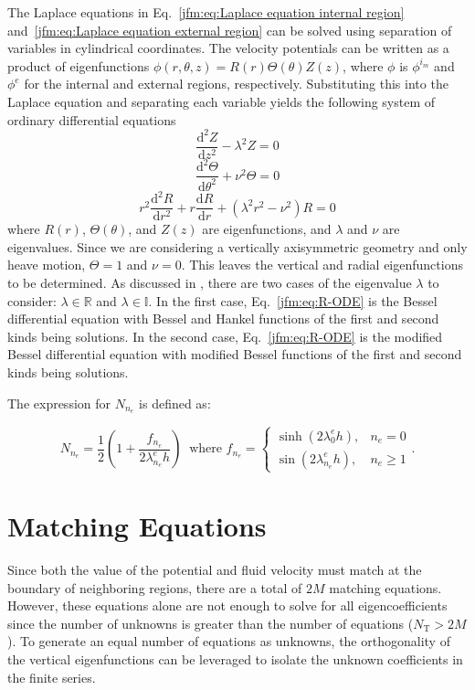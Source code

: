 The Laplace equations in Eq.~\ref{jfm:eq:Laplace equation internal region} and~\ref{jfm:eq:Laplace equation external region} can be solved using separation of variables in cylindrical coordinates. The velocity potentials can be written as a product of eigenfunctions $\phi (r, \theta, z)= R(r)\Theta(\theta)Z(z)$, where $\phi$ is $\phi^{i_m}$ and $\phi^{e}$ for the internal and external regions, respectively. Substituting this into the Laplace equation and separating each variable yields the following system of ordinary differential equations
\begin{equation}\label{jfm:eq:Z-ODE}
    \frac{\mathrm{d}^2 Z}{\mathrm{d}z^2}-\lambda^2Z=0
\end{equation}
\begin{equation}\label{jfm:eq:Theta-ODE}
    \frac{\mathrm{d}^2 \Theta}{\mathrm{d}\theta^2}+\nu^2\Theta=0
\end{equation}
\begin{equation}\label{jfm:eq:R-ODE}
    r^2\frac{\mathrm{d}^2 R}{\mathrm{d}r^2}+r\frac{\mathrm{d} R}{\mathrm{d}r} + (\lambda^2r^2-\nu^2)R=0
\end{equation}
where $R(r)$, $\Theta(\theta)$, and $Z(z)$ are eigenfunctions, and $\lambda$ and $\nu$ are eigenvalues. Since we are considering a vertically axisymmetric geometry and only heave motion, $\Theta=1$ and $\nu=0$. This leaves the vertical and radial eigenfunctions to be determined. As discussed in \citet{chatzigeorgiou2018analytical}, there are two cases of the eigenvalue $\lambda$ to consider: $\lambda \in \mathbb{R}$ and $\lambda \in \mathbb{I}$. In the first case, Eq.~\ref{jfm:eq:R-ODE} is the Bessel differential equation with Bessel and Hankel functions of the first and second kinds being solutions. In the second case, Eq.~\ref{jfm:eq:R-ODE} is the modified Bessel differential equation with modified Bessel functions of the first and second kinds being solutions.

The expression for $N_{n_e}$ is defined as:

\begin{equation}
    N_{n_e} = \frac{1}{2}\left(1+\frac{f_{n_e}}{2\lambda_{n_e}^eh}  \right)~
    \textrm{ where }
    f_{n_e} = 
    \begin{cases}
        \sinh(2 \lambda_0^e h), & n_e=0 \\ \sin(2\lambda_{n_e}^eh), & n_e\geq1
    \end{cases}.
\end{equation}
%
\section{Matching Equations}\label{jfm:appB}
Since both the value of the potential and fluid velocity must match at the boundary of neighboring regions, there are a total of $2M$ matching equations. However, these equations alone are not enough to solve for all eigencoefficients since the number of unknowns is greater than the number of equations ($N_\mathrm{T} >2M$). To generate an equal number of equations as unknowns, the orthogonality of the vertical eigenfunctions can be leveraged to isolate the unknown coefficients in the finite series. 

